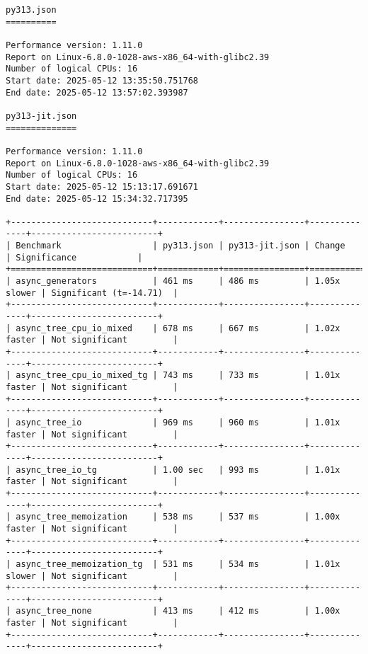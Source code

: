 \begin{code}
    \begin{verbatim}
py313.json
==========

Performance version: 1.11.0
Report on Linux-6.8.0-1028-aws-x86_64-with-glibc2.39
Number of logical CPUs: 16
Start date: 2025-05-12 13:35:50.751768
End date: 2025-05-12 13:57:02.393987

py313-jit.json
==============

Performance version: 1.11.0
Report on Linux-6.8.0-1028-aws-x86_64-with-glibc2.39
Number of logical CPUs: 16
Start date: 2025-05-12 15:13:17.691671
End date: 2025-05-12 15:34:32.717395

+----------------------------+------------+----------------+--------------+-------------------------+
| Benchmark                  | py313.json | py313-jit.json | Change       | Significance            |
+============================+============+================+==============+=========================+
| async_generators           | 461 ms     | 486 ms         | 1.05x slower | Significant (t=-14.71)  |
+----------------------------+------------+----------------+--------------+-------------------------+
| async_tree_cpu_io_mixed    | 678 ms     | 667 ms         | 1.02x faster | Not significant         |
+----------------------------+------------+----------------+--------------+-------------------------+
| async_tree_cpu_io_mixed_tg | 743 ms     | 733 ms         | 1.01x faster | Not significant         |
+----------------------------+------------+----------------+--------------+-------------------------+
| async_tree_io              | 969 ms     | 960 ms         | 1.01x faster | Not significant         |
+----------------------------+------------+----------------+--------------+-------------------------+
| async_tree_io_tg           | 1.00 sec   | 993 ms         | 1.01x faster | Not significant         |
+----------------------------+------------+----------------+--------------+-------------------------+
| async_tree_memoization     | 538 ms     | 537 ms         | 1.00x faster | Not significant         |
+----------------------------+------------+----------------+--------------+-------------------------+
| async_tree_memoization_tg  | 531 ms     | 534 ms         | 1.01x slower | Not significant         |
+----------------------------+------------+----------------+--------------+-------------------------+
| async_tree_none            | 413 ms     | 412 ms         | 1.00x faster | Not significant         |
+----------------------------+------------+----------------+--------------+-------------------------+

\end{verbatim}
\end{code}
